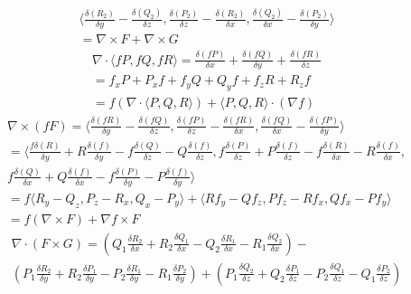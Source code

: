 \documentclass[12pt]{exam}
\begin{document}
\begin{questions}
\begin{solution}
\begin{questions}
\begin{gather*}
                    \langle \frac{\delta (R_2)}{\delta y} - \frac{\delta (Q_2)}{\delta z}, \frac{\delta (P_2)}{\delta z} - \frac{\delta (R_2)}{\delta x}, \frac{\delta (Q_2)}{\delta x} - \frac{\delta (P_2)}{\delta y} \rangle \\
                    = \nabla \times F + \nabla \times G
                \end{gather*}
            \question 
                \begin{gather*}
                    \nabla \cdot \langle fP, fQ, fR \rangle = \frac{\delta (fP)}{\delta x} + \frac{\delta (fQ)}{\delta y} + \frac{\delta (fR)}{\delta z} \\
                    = f_x P + P_x f + f_y Q + Q_y f + f_z R + R_z f\\
                    = f(\nabla \cdot \langle P, Q, R \rangle) + \langle P, Q, R \rangle \cdot (\nabla f)
                \end{gather*}
            \question
                \begin{gather*}
                    \nabla \times (fF) = \langle \frac{\delta (fR)}{\delta y} - \frac{\delta (fQ)}{\delta z}, \frac{\delta (fP)}{\delta z} - \frac{\delta (fR)}{\delta x}, \frac{\delta (fQ)}{\delta x} - \frac{\delta (fP)}{\delta y} \rangle \\
                    = \langle \frac{f\delta (R)}{\delta y} + R\frac{\delta (f)}{\delta y} - f\frac{\delta (Q)}{\delta z} - Q\frac{\delta (f)}{\delta z}, f\frac{\delta (P)}{\delta z} + P\frac{\delta (f)}{\delta z} - f\frac{\delta (R)}{\delta x} - R\frac{\delta (f)}{\delta x}, \\ f\frac{\delta (Q)}{\delta x} + Q\frac{\delta (f)}{\delta x} - f\frac{\delta (P)}{\delta y} - P\frac{\delta (f)}{\delta y}\rangle \\
                    = f \langle R_y - Q_z, P_z - R_x, Q_x - P_y \rangle + \langle R f_y - Q f_z, P f_z - R f_x, Q f_x - P f_y \rangle \\
                    = f (\nabla \times F) + \nabla f \times F
                \end{gather*}
            \question 
                \begin{gather*}
                    \nabla \cdot (F \times G) = \left( Q_1 \frac{\delta R_2}{\delta x} + R_2 \frac{\delta Q_1}{\delta x} - Q _2\frac{\delta R_1}{\delta x} - R_1\frac{\delta Q_2}{\delta x} \right) - \\ \left( P_1 \frac{\delta R_2}{\delta y} + R_2 \frac{\delta P_1}{\delta y} - P_2\frac{\delta R_1}{\delta y} - R_1\frac{\delta P_2}{\delta y} \right) + \left( P_1 \frac{\delta Q_2}{\delta z} + Q_2 \frac{\delta P_1}{\delta z} - P_2\frac{\delta Q_1}{\delta z} - Q_1\frac{\delta P_2}{\delta z} \right) \\\\

\end{gather*}
\end{questions}
\end{solution}
\end{questions}
\end{document}
